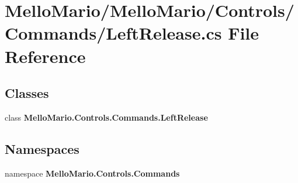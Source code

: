 \section{Mello\+Mario/\+Mello\+Mario/\+Controls/\+Commands/\+Left\+Release.cs File Reference}
\label{LeftRelease_8cs}
\subsection*{Classes}
\begin{DoxyCompactItemize}
\item 
class \textbf{ Mello\+Mario.\+Controls.\+Commands.\+Left\+Release}
\end{DoxyCompactItemize}
\subsection*{Namespaces}
\begin{DoxyCompactItemize}
\item 
namespace \textbf{ Mello\+Mario.\+Controls.\+Commands}
\end{DoxyCompactItemize}

